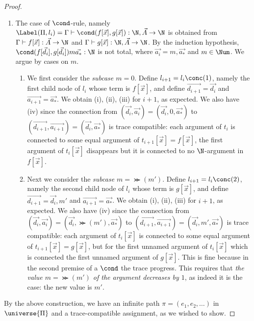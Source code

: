 \begin{proof}
\begin{enumerate}
\item
  The case of $\cond$-rule, namely
  $\Label(\Pi,l_i) = \Gamma\vdash \cond(f[\vec{x}],g[\vec{x}]):\N,\vec{A}\rightarrow\N$
  is obtained from 
  $\Gamma\vdash f[\vec{x}]:\vec{A}\rightarrow\N$
  and
  $\Gamma\vdash g[\vec{x}]:\N,\vec{A}\rightarrow\N$. 
  By the induction hypothesis, $\cond(f[\vec{d_i}],g[\vec{d_i}])m\vec{a_*}:\N$ is not total,
  where $\vec{a_i} = m,\vec{a_*}$ and $m \in \Num$. We argue by cases on $m$.
  \begin{enumerate}
  \item
    We first consider the \emph{subcase $m=0$}.
    Define $l_{i+1}=l_i\conc(1)$, namely the first child node of $l_i$ whose term is $f[\vec{x}]$,
    and define $\vec{d_{i+1}} = \vec{d_i}$ and $\vec{a_{i+1}} = \vec{a_*}$. 
    We obtain (i), (ii), (iii) for $i+1$, as expected. 
    We also have (iv) since the connection from 
    $(\vec{d_i},\vec{a_i}) =(\vec{d_i},0,\vec{a_*})$ to
    $(\vec{d_{i+1}},\vec{a_{i+1}}) = (\vec{d_i},\vec{a_*})$ is trace compatible: 
    each argument of $t_i$ is connected to some equal argument of $t_{i+1}[\vec{x}]=f[\vec{x}]$,
    the first argument of $t_i[\vec{x}]$ disappears but it is connected to no $\N$-argument in $f[\vec{x}]$.
  \item
    Next we consider the \emph{subcase $m=\Succ(m')$}. 
    Define $l_{i+1}=l_i\conc(2)$, namely the second child node of $l_i$ whose term is $g[\vec{x}]$,
    and define $\vec{d_{i+1}} = \vec{d_i},m'$ and $\vec{a_{i+1}} = \vec{a_*}$. 
    We obtain (i), (ii), (iii) for $i+1$, as expected.
    We also have (iv) since the connection from 
    $(\vec{d_i},\vec{a_i})
    =(\vec{d_i},\Succ(m'),\vec{a_*})$ to $(\vec{d_{i+1}},\vec{a_{i+1}}) = (\vec{d_i},m',\vec{a_*})$
    is trace compatible: 
    each argument of $t_i[\vec{x}]$ is connected to some equal argument of 
    $t_{i+1}[\vec{x}]=g[\vec{x}]$,
    but for the first unnamed argument of $t_i[\vec{x}]$ 
    which is connected the first unnamed argument of $g[\vec{x}]$.
    This is fine because in the second premise of a $\cond$ 
    the trace progress. This requires that \emph{the value $m=\Succ(m')$ of the argument decreases by $1$}, 
    as indeed it is the case: the new value is $m'$.
  \end{enumerate}

\end{enumerate}

By the above construction, we have an infinite path $\pi = (e_1,e_2,\ldots)$ in $\universe{\Pi}$
and a trace-compatible assignment, as we wished to show.

  
\end{proof}

